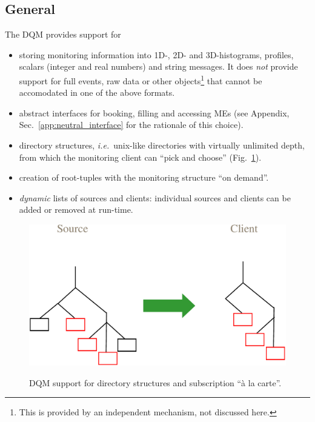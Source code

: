 \documentclass[a4paper]{cmspaper}
\newcommand {\ie}{\mbox{\sl i.e. }}     %
\begin{document}
\subsection{General}
\label{sec:req_general}
The DQM provides support for 
\begin{itemize}
\item{storing monitoring information into 1D-, 2D- and 3D-histograms,
profiles, scalars (integer and real numbers) and string messages. It
does \emph{not} provide support for full events, raw data or other
objects\footnote{This is provided by an independent mechanism, not
discussed here.} that cannot be accomodated in one of the above formats.} 
\item{abstract interfaces for booking, filling and accessing MEs (see
Appendix, Sec.~\ref{app:neutral_interface} for the rationale of this
choice).} 
\item{directory structures, \ie unix-like directories with
virtually unlimited depth, from which the monitoring client can ``pick
and choose'' (Fig.~\ref{fig:dir_structure_support}). }
\item{creation of root-tuples with the monitoring structure ``on demand''.}
\item{\emph{dynamic} lists of sources and clients: individual sources and
clients can be added or removed at run-time.} 
\end{itemize}
%
\begin{figure}[hbtp]
  \begin{center}
    \resizebox{10cm}{!}
	{\includegraphics{figures/dir_structure_support}} 
\caption{DQM support for directory structures and subscription ``\`a
la carte''.}
\label{fig:dir_structure_support}
  \end{center}
\end{figure}
%
%
\end{document}
